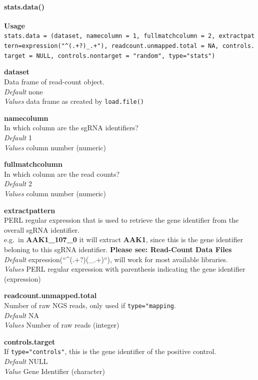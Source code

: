 \documentclass[]{article}
\let\oldparagraph\paragraph
\renewcommand{\paragraph}[1]{\oldparagraph{#1}\mbox{}}
\begin{document}
\paragraph{stats.data()}\label{stats.data}

\textbf{Usage}\\
\texttt{stats.data\ =\ (dataset,\ namecolumn\ =\ 1,\ fullmatchcolumn\ =\ 2,\ extractpattern=expression("\^{}(.+?)\_.+"),\ readcount.unmapped.total\ =\ NA,\ controls.target\ =\ NULL,\ controls.nontarget\ =\ "random",\ type="stats")}

\textbf{dataset}\\
Data frame of read-count object.\\
\emph{Default} none\\
\emph{Values} data frame as created by \texttt{load.file()}

\textbf{namecolumn}\\
In which column are the sgRNA identifiers?\\
\emph{Default} 1\\
\emph{Values} column number (numeric)

\textbf{fullmatchcolumn}\\
In which column are the read counts?\\
\emph{Default} 2\\
\emph{Values} column number (numeric)

\textbf{extractpattern}\\
PERL regular expression that is used to retrieve the gene identifier
from the overall sgRNA identifier.\\
e.g.~in \textbf{AAK1\_107\_0} it will extract \textbf{AAK1}, since this
is the gene identifier beloning to this sgRNA identifier. \textbf{Please
see: Read-Count Data Files}\\
\emph{Default} expression(``\^{}(.+?)(\_.+)``), will work for most
available libraries.\\
\emph{Values} PERL regular expression with parenthesis indicating the
gene identifier (expression)

\textbf{readcount.unmapped.total}\\
Number of raw NGS reads, only used if \texttt{type="mapping}.\\
\emph{Default} NA\\
\emph{Values} Number of raw reads (integer)

\textbf{controls.target}\\
If \texttt{type="controls"}, this is the gene identifier of the positive
control.\\
\emph{Default} NULL\\
\emph{Value} Gene Identifier (character)
\end{document}

